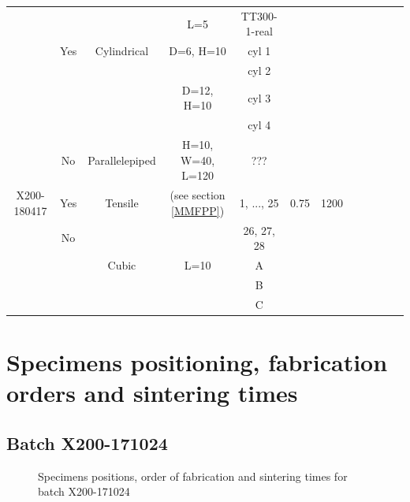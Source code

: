 \begin{center}
\begin{landscape}
\begin{savenotes}
\begin{longtable}{@{\extracolsep{\fill}}*{12}{|c}|@{}}
  & & &  L=5& TT300-1-real &  & & & & & &\\ 
  & Yes &  Cylindrical & D=6, H=10&cyl 1   &  & & & & & &\\
    & &  & &cyl 2 & & & & & & &\\
    & &  & D=12, H=10 &cyl 3 & & & & & & &\\
    & &  &  &cyl 4  & & & & & & &\\
 & No & Parallelepiped & H=10, W=40, L=120 & ??? & & & & & & &\\ 
    \hline 
X200-180417 & Yes & Tensile & (see section \ref{MMFPP}) & 1, ..., 25 & 0.75 &1200 & & & & &\\
& No &  & & 26, 27, 28 & && & & & &\\
&  & Cubic & L=10 & A & && & & & &\\
&  & & & B & && & & & &\\
&  & & & C & && & & & &\\
\end{longtable}
\end{savenotes}
\end{landscape}
 \end{center}

\section{Specimens positioning, fabrication orders and sintering times}
\label{mda}
\subsection{Batch X200-171024}

\begin{figure}[ht]
\centering
\noindent{}
\decoRule
\caption[Specimens positions, order of fabrication and sintering times for batch X200-171024]{Specimens positions, order of fabrication and sintering times for batch X200-171024}
\label{fig:171024-cad}
\end{figure}


